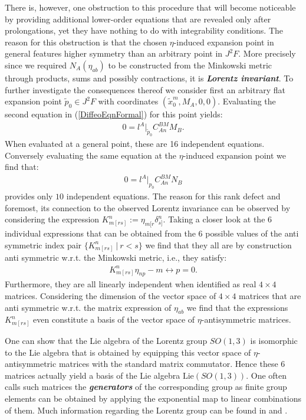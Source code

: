 There is, however, one obstruction to this procedure that will become noticeable by providing additional lower-order equations that are revealed only after prolongations, yet they have nothing to do with integrability conditions. 
The reason for this obstruction is that the chosen $\eta$-induced expansion point in general features higher symmetry than an arbitrary point in $J^2F$. More precisely since we required $N_A(\eta_{ab})$ to be constructed from the Minkowski metric through products, sums and possibly contractions, it is \textit{\textbf{Lorentz invariant}}. To further investigate the consequences thereof we consider first an arbitrary flat expansion point $\tilde{p}_0 \in J^2F$ with coordinates $(\tilde{x}_0^m,M_A,0,0)$. Evaluating the second equation in (\ref{DiffeoEqnFormal}) for this point yields:
\begin{align}
    0 = l^A \vert _{\tilde{p}_0} C^{BM}_{An}M_B.
\end{align}
When evaluated at a general point, these are 16 independent equations. 
Conversely evaluating the same equation at the $\eta$-induced expansion point we find that:
\begin{align}\label{RankDef}
    0 = l^A \vert_{p_0} C^{BM}_{An}N_B
\end{align}
provides only $10$ independent equations. The reason for this rank defect and foremost, its connection to the observed Lorentz invariance can be observed by considering the expression $K_{m[rs]}^n :=\eta_{m[r}\delta_{s]}^n$. 
Taking a closer look at the $6$ individual expressions that can be obtained from the $6$ possible values of the anti symmetric index pair  $\{K_{m[rs]}^n \ \vert \ r < s \} $ we find that they all are by construction anti symmetric w.r.t. the Minkowski metric, i.e., they satisfy: 
\begin{align}
K_{m[rs]}^n\eta_{n p} - m \leftrightarrow p = 0.
\end{align}
Furthermore, they are all linearly independent when identified as real $4 \times 4$ matrices. Considering the dimension of the vector space of $4 \times 4$ matrices that are anti symmetric w.r.t. the matrix expression of $\eta_{ab}$ we find that  the expressions $K_{m[rs]}^n$ even constitute a basis of the vector space of $\eta$-antisymmetric matrices. 

One can show that the Lie algebra of the Lorentz group $SO(1,3)$ is isomorphic to the Lie algebra that is obtained by equipping this vector space of $\eta$-antisymmetric matrices with the standard matrix commutator. Hence these $6$ matrices actually yield a basis of the Lie algebra $\mathrm{Lie}(SO(1,3))$. One often calls such matrices the \textit{\textbf{generators}} of the corresponding group as finite group elements can be obtained by applying the exponential map to linear combinations of them. Much information regarding the Lorentz group can be found in \cite{doi:10.1142/p199} and \cite{naimark2014linear}.

